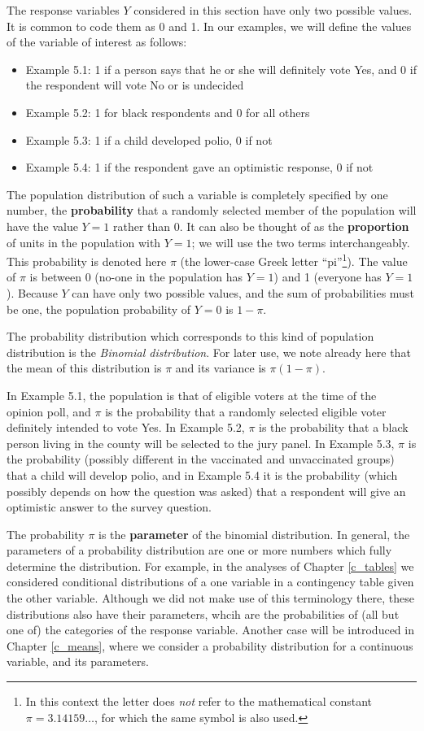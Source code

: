 The response variables $Y$ considered in this section have only  two
possible values. It is common to code them as 0 and 1. In our examples, we will
define the values of the variable of interest as follows:
\begin{itemize}
\item
Example 5.1: 1 if a person says that he or she will
definitely vote Yes, and 0 if the respondent will vote No or is
undecided
\item
Example 5.2: 1 for black respondents and 0 for all others
\item
Example 5.3: 1 if a child developed polio, 0 if not
\item
Example 5.4: 1 if the respondent gave an optimistic response, 0 if not
\end{itemize}
The population distribution of such a variable is completely specified
by one number, the \textbf{probability} that a randomly selected member
of the population will have the value $Y=1$ rather than 0.
It can also be thought of as the \textbf{proportion} of units
in the population with $Y=1$; we will
use the two terms interchangeably.
This probability is denoted here $\pi$ (the lower-case Greek letter ``pi''\footnote{In this
context the letter does \emph{not} refer to the mathematical constant
$\pi=3.14159\dots$, for which the same symbol is also used.}). The value
of $\pi$ is between 0 (no-one in the population has $Y=1$) and 1
(everyone has $Y=1$). Because $Y$ can have only two possible values, and
the sum of probabilities must be one, the population probability of $Y=0$
is $1-\pi$.

\label{Binomial}
The probability distribution which corresponds to this kind of
population distribution is the \emph{Binomial distribution}.
For later use, we note already here that the mean of this distribution
is $\pi$ and its variance is $\pi(1-\pi)$.

In Example 5.1, the population is that of eligible voters at the time of
the opinion poll, and $\pi$ is the probability that a randomly selected
eligible voter definitely intended to vote Yes. In Example
5.2, $\pi$ is the probability that a black
person living in the county will be selected to the jury panel. In
Example 5.3, $\pi$ is the probability (possibly different in the
vaccinated and unvaccinated groups) that a child will develop polio, and
in Example 5.4 it is the probability (which possibly depends on how the
question was asked) that a respondent will give an optimistic answer to
the survey question.

The probability $\pi$ is the \textbf{parameter} of the binomial
distribution. In general, the parameters of a probability distribution
are one or more numbers which fully determine the distribution. For
example, in the analyses of Chapter \ref{c_tables} we considered
conditional distributions of a one variable in a contingency table
given the other variable. Although we did not make use of
this terminology there, these distributions also have their parameters,
whcih are the probabilities of (all but one of) the categories of the
response variable. Another case will be introduced in Chapter
\ref{c_means}, where we consider a probability distribution for a
continuous variable, and its parameters.

